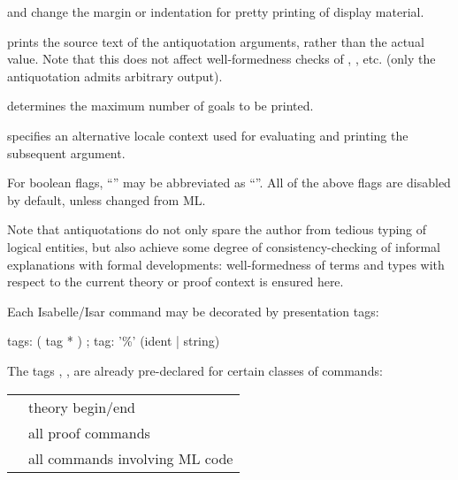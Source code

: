 \begin{isabellebody}
\begin{isamarkuptext}
\begin{descr}
  \item[\isa{margin\ {\isacharequal}\ nat} and \isa{indent\ {\isacharequal}\ nat}] change the
  margin or indentation for pretty printing of display material.

  \item[\isa{source\ {\isacharequal}\ bool}] prints the source text of the
  antiquotation arguments, rather than the actual value.  Note that
  this does not affect well-formedness checks of \mbox{}, \mbox{}, etc. (only the \mbox{} antiquotation admits arbitrary output).

  \item[\isa{goals{\isacharunderscore}limit\ {\isacharequal}\ nat}] determines the maximum number of
  goals to be printed.

  \item[\isa{locale\ {\isacharequal}\ name}] specifies an alternative locale
  context used for evaluating and printing the subsequent argument.

  \end{descr}

  For boolean flags, ``'' may be abbreviated as
  ``''.  All of the above flags are disabled by default,
  unless changed from ML.

  \medskip Note that antiquotations do not only spare the author from
  tedious typing of logical entities, but also achieve some degree of
  consistency-checking of informal explanations with formal
  developments: well-formedness of terms and types with respect to the
  current theory or proof context is ensured here.%
\end{isamarkuptext}%
\isamarkuptrue%
%
\isamarkuptrue%
%
\begin{isamarkuptext}%
Each Isabelle/Isar command may be decorated by presentation tags:

  \begin{rail}
    tags: ( tag * )
    ;
    tag: '\%' (ident | string)
  \end{rail}

  The tags , ,  are already
  pre-declared for certain classes of commands:

 \medskip

  \begin{tabular}{ll}
    \isa{theory} & theory begin/end \\
    \isa{proof} & all proof commands \\
    \isa{ML} & all commands involving ML code \\
  \end{tabular}


\end{isamarkuptext}
\end{isabellebody}

